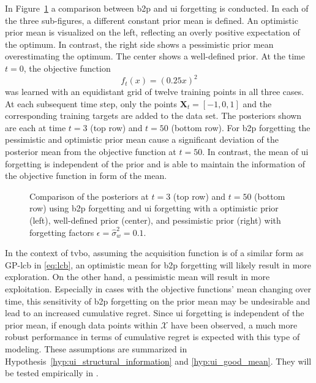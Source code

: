 In Figure~\ref{fig:different_priors} a comparison between \gls{b2p} and \gls{ui} forgetting is conducted. In each of the three sub-figures, a different constant prior mean is defined. An optimistic prior mean is visualized on the left, reflecting an overly positive expectation of the optimum. In contrast, the right side shows a pessimistic prior mean overestimating the optimum. The center shows a well-defined prior. At the time $t=0$, the objective function
\begin{equation}
    f_t(x) = (0.25x)^2
    \label{eq:example_objective}
\end{equation}
 was learned with an equidistant grid of twelve training points in all three cases. At each subsequent time step, only the points $\mathbf{X}_t = [-1, 0, 1]$ and the corresponding training targets are added to the data set. The posteriors shown are each at time $t=3$ (top row) and $t=50$ (bottom row). For \gls{b2p} forgetting the pessimistic and optimistic prior mean cause a significant deviation of the posterior mean from the objective function at $t=50$. In contrast, the mean of \gls{ui} forgetting is independent of the prior and is able to maintain the information of the objective function in form of the mean.
\begin{figure}[h]
    \centering
    
    \caption[Comparing the distribution propagation for \gls{ui} and \gls{b2p} forgetting for different prior means.]{Comparison of the posteriors at $t=3$ (top row) and $t=50$ (bottom row) using \gls{b2p} forgetting and \gls{ui} forgetting with a optimistic prior (left), well-defined prior (center), and pessimistic prior (right) with forgetting factors $\epsilon=\hat{\sigma}_w^2=0.1$.}
    \label{fig:different_priors}
\end{figure}

In the context of \gls{tvbo}, assuming the acquisition function is of a similar form as GP-\gls{lcb} \cite{Srinivas_2010} in \eqref{eq:lcb}, an optimistic mean for \gls{b2p} forgetting will likely result in more exploration. On the other hand, a pessimistic mean will result in more exploitation. Especially in cases with the objective functions' mean changing over time, this sensitivity of \gls{b2p} forgetting on the prior mean may be undesirable and lead to an increased cumulative regret. Since \gls{ui} forgetting is independent of the prior mean, if enough data points within $\mathcal{X}$ have been observed, a much more robust performance in terms of cumulative regret is expected with this type of modeling. 
These assumptions are summarized in Hypothesis~\ref{hyp:ui_structural_information} and \ref{hyp:ui_good_mean}. They will be tested empirically in .

